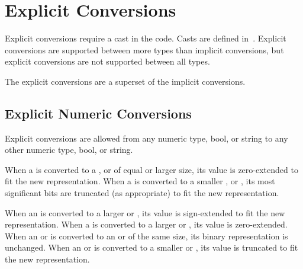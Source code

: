 \section{Explicit Conversions}
\label{Explicit_Conversions}

Explicit conversions require a cast in the code.  Casts are defined
in~.  Explicit conversions are supported between more
types than implicit conversions, but explicit conversions are not
supported between all types.

The explicit conversions are a superset of the implicit conversions.

\subsection{Explicit Numeric Conversions}
\label{Explicit_Numeric_Conversions}

Explicit conversions are allowed from any numeric type, bool, or
string to any other numeric type, bool, or string.  

When a  is converted to a , 
or  of equal or larger size, its value is zero-extended to fit the
new representation.  When a  is converted to a
smaller ,  or , its most significant
bits are truncated (as appropriate) to fit the new representation.

When an  is converted to a larger  or , its value is
sign-extended to fit the new representation.  
When a  is converted to a larger  or , its value
is zero-extended.
When an  or  is converted to an  or 
of the same size, its binary representation is unchanged.
When an  or  is converted to a smaller 
or , its value is truncated to fit the new representation.

